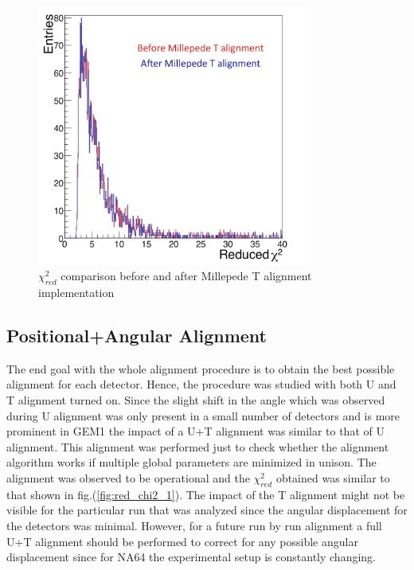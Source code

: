  \begin{figure}[h!]
 \centering
 \includegraphics[width=0.8\textwidth]{thesis_figures/alignment/red_chi2_T.png}
 \caption{$\chi_{red}^2$ comparison before and after Millepede T alignment implementation}
 \label{fig:red_chi2_3}
 \end{figure}
\FloatBarrier

\subsection{Positional+Angular Alignment}
The end goal with the whole alignment procedure is to obtain the best possible alignment for each detector. Hence, the procedure was studied with both U and T alignment turned on.
Since the slight shift in the angle which was observed during U alignment was only present in a small number of detectors and is more prominent in GEM1 the impact of a U+T alignment was similar to that of U alignment. This alignment was performed just to check whether the alignment algorithm works if multiple global parameters are minimized in unison. The alignment was observed to be operational and the $\chi^2_{red}$ obtained was similar to that shown in fig.(\ref{fig:red_chi2_1}). The impact of the T alignment might not be visible for the particular run that was analyzed since the angular displacement for the detectors was minimal. However, for a future run by run alignment a full U+T alignment should be performed to correct for any possible angular displacement since for NA64 the experimental setup is constantly changing.


